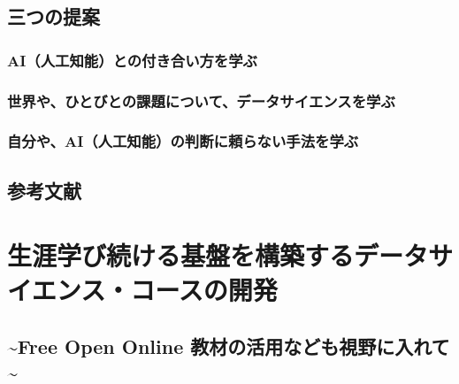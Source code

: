 \documentclass[
]{book}
\theoremstyle{definition}
\theoremstyle{definition}
\theoremstyle{definition}
\theoremstyle{definition}
\theoremstyle{remark}
\begin{document}
\hypertarget{ux4e09ux3064ux306eux63d0ux6848}{%
\section{三つの提案}\label{ux4e09ux3064ux306eux63d0ux6848}}

\hypertarget{aiux4ebaux5de5ux77e5ux80fdux3068ux306eux4ed8ux304dux5408ux3044ux65b9ux3092ux5b66ux3076}{%
\subsection{AI（人工知能）との付き合い方を学ぶ}\label{aiux4ebaux5de5ux77e5ux80fdux3068ux306eux4ed8ux304dux5408ux3044ux65b9ux3092ux5b66ux3076}}

\hypertarget{ux4e16ux754cux3084ux3072ux3068ux3073ux3068ux306eux8ab2ux984cux306bux3064ux3044ux3066ux30c7ux30fcux30bfux30b5ux30a4ux30a8ux30f3ux30b9ux3092ux5b66ux3076}{%
\subsection{世界や、ひとびとの課題について、データサイエンスを学ぶ}\label{ux4e16ux754cux3084ux3072ux3068ux3073ux3068ux306eux8ab2ux984cux306bux3064ux3044ux3066ux30c7ux30fcux30bfux30b5ux30a4ux30a8ux30f3ux30b9ux3092ux5b66ux3076}}

\hypertarget{ux81eaux5206ux3084aiux4ebaux5de5ux77e5ux80fdux306eux5224ux65adux306bux983cux3089ux306aux3044ux624bux6cd5ux3092ux5b66ux3076}{%
\subsection{自分や、AI（人工知能）の判断に頼らない手法を学ぶ}\label{ux81eaux5206ux3084aiux4ebaux5de5ux77e5ux80fdux306eux5224ux65adux306bux983cux3089ux306aux3044ux624bux6cd5ux3092ux5b66ux3076}}

\hypertarget{ux53c2ux8003ux6587ux732e}{%
\section*{参考文献}\label{ux53c2ux8003ux6587ux732e}}

\hypertarget{coursedesign}{%
\chapter{生涯学び続ける基盤を構築するデータサイエンス・コースの開発}\label{coursedesign}}

\hypertarget{free-open-online-ux6559ux6750ux306eux6d3bux7528ux306aux3069ux3082ux8996ux91ceux306bux5165ux308cux3066}{%
\section*{\textasciitilde Free Open Online 教材の活用なども視野に入れて\textasciitilde{}}\label{free-open-online-ux6559ux6750ux306eux6d3bux7528ux306aux3069ux3082ux8996ux91ceux306bux5165ux308cux3066}}
\end{document}
